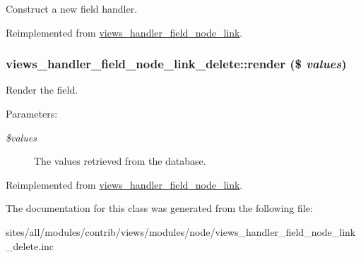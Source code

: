 Construct a new field handler. 

Reimplemented from \hyperlink{classviews__handler__field__node__link_c3f643ba7dd0435fc03c7bf477907484}{views\_\-handler\_\-field\_\-node\_\-link}.\hypertarget{classviews__handler__field__node__link__delete_f0b922dd3c019c53247d0c30c83cfc99}{
\subsubsection[{render}]{\setlength{\rightskip}{0pt plus 5cm}views\_\-handler\_\-field\_\-node\_\-link\_\-delete::render (\$ {\em values})}}
\label{classviews__handler__field__node__link__delete_f0b922dd3c019c53247d0c30c83cfc99}


Render the field.

\begin{Desc}
\item[Parameters:]
\begin{description}
\item[{\em \$values}]The values retrieved from the database. \end{description}
\end{Desc}


Reimplemented from \hyperlink{classviews__handler__field__node__link_9621ff38a6b318eb94f0c44fa2f711f5}{views\_\-handler\_\-field\_\-node\_\-link}.

The documentation for this class was generated from the following file:\begin{CompactItemize}
\item 
sites/all/modules/contrib/views/modules/node/views\_\-handler\_\-field\_\-node\_\-link\_\-delete.inc\end{CompactItemize}

